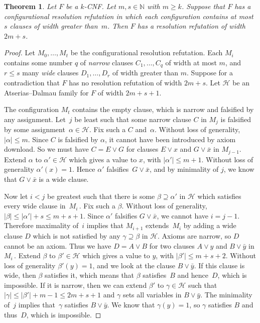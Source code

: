 \documentclass[11pt]{article}
\numberwithin{equation}{section}
\newtheorem{theorem}{Theorem}[section]
\theoremstyle{definition}
\theoremstyle{plain}
\newcommand{\N}{\mathbb N}
\newcommand\calH{\mathcal{H}}
\newcommand\barx{\bar{x}}
\newcommand\bary{\bar{y}}
\begin{document}
\begin{theorem} \label{thm:total_space}
Let $F$ be a $k$-CNF.
Let $m, s \in \N$ with $m \ge k$.
Suppose that $F$ has a configurational resolution refutation in which
 each configuration
contains at most $s$ clauses of width greater than~$m$.
Then $F$ has a resolution refutation of width $2m+s$.
\end{theorem}

\begin{proof}
Let $M_0, \dots, M_t$ be the configurational resolution refutation. 
Each  $M_i$  contains some number $q$ of \emph{narrow} clauses 
$C_1, \dots, C_q$ of width at most $m$,
and $r \le s$ 
many \emph{wide} clauses $D_1, \dots, D_r$ of width greater than $m$.
Suppose
for a contradiction that $F$ has no resolution refutation of width $2m+s$. Let 
$\calH$ be an  Atserias--Dalmau family for $F$ of width $2m+s+1$.

The configuration $M_t$ contains the empty clause, which is narrow and falsified by any assignment.
Let~$j$ be least such that some narrow clause
$C$ in $M_j$ is falsified by some assignment~$\alpha \in \calH$. Fix such a $C$ and~$\alpha$.
Without loss of generality, $|\alpha|\le m$.
Since $C$ is falsified by $\alpha$, it cannot have been introduced by axiom download.
So we must have $C = E \vee G$ for clauses $E \vee x$ and $G \vee \bar{x}$ in $M_{j-1}$.
Extend $\alpha$ to $\alpha' \in \calH$ which gives a value to $x$, with $|\alpha'| \le m+1$. Without loss of
generality $\alpha'(x)=1$. Hence $\alpha'$ falsifies~$G \vee \bar{x}$, and by minimality
of $j$, we know that $G \vee \bar{x}$ is a wide clause.


Now let $i<j$ be greatest such that there is some $\beta \supseteq \alpha'$ in $\calH$ which
satisfies every wide clause in~$M_i$\,. Fix such a $\beta$. Without loss of generality,
 $|\beta| \le |\alpha'|+s \le m +s + 1$.
Since $\alpha'$ falsifies $G \vee \barx$,
we cannot have $i=j-1$. Therefore maximality of~$i$ implies that $M_{i+1}$ extends~$M_i$ by adding a
wide clause $D$ which is not satisfied by any $\gamma \supseteq \beta$ in $\calH$.
Axioms are narrow, so $D$ cannot be an axiom.
Thus we have $D = A \vee B$
for two clauses $A \vee y$ and $B \vee \bary$ in $M_i$\,.
Extend $\beta$ to $\beta' \in \calH$ which gives a value to $y$, with $|\beta'|\le m+s+2$.
Without loss of generality $\beta'(y)=1$, and we look at the clause $B \vee \bary$.
If this clause is wide, then $\beta$ satisfies it, which means that $\beta$ satisfies~$B$ and hence~$D$,
which is impossible. If it is narrow, then we can extend $\beta'$ to $\gamma \in \calH$
such that $|\gamma| \le |\beta'| + m - 1 \le 2m + s + 1$ and $\gamma$
sets all variables in $B \vee \bary$. The minimality of~$j$ implies that~$\gamma$
satisfies $B \vee \bary$. We know that $\gamma(y) = 1$, 
so $\gamma$ satisfies $B$ and thus~$D$, which is impossible.
\end{proof}
\end{document}
